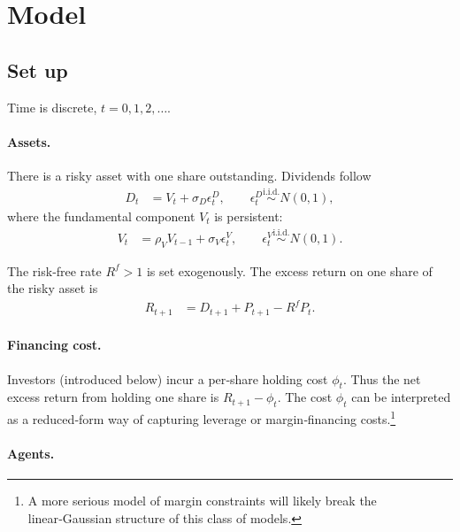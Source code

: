 \documentclass[12pt]{article}
\begin{document}
\thispagestyle{empty}


\setcounter{page}{1}


\newpage
\section{Model}

\subsection{Set up}

Time is discrete, \(t = 0,1,2,\dots\).

\paragraph{Assets.}
There is a risky asset with one share outstanding. Dividends follow
\begin{align*}
    D_t & = V_t + \sigma_D \epsilon_t^D, \qquad \epsilon_t^D \stackrel{\text{i.i.d.}}{\sim} N(0,1),
\end{align*}
where the fundamental component \(V_t\) is persistent:
\begin{align*}
    V_t & = \rho_V V_{t-1} + \sigma_V \epsilon_t^V, \qquad \epsilon_t^V \stackrel{\text{i.i.d.}}{\sim} N(0,1).
\end{align*}

The risk‑free rate \(R^f > 1\) is set exogenously. The excess return on one share of the risky asset is
\begin{align}
    R_{t+1} & = D_{t+1} + P_{t+1} - R^f P_t . \label{excess_return}
\end{align}


\paragraph{Financing cost.}
Investors (introduced below) incur a per‑share holding cost \(\phi_t\).  
Thus the net excess return from holding one share is \(R_{t+1} - \phi_t\).  
The cost \(\phi_t\) can be interpreted as a reduced‑form way of capturing leverage or margin‑financing costs.\footnote{A more serious model of margin constraints will likely break the linear‑Gaussian structure of this class of models.}

\paragraph{Agents.}
\end{document}
